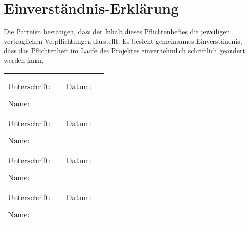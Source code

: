\section{Einverständnis-Erklärung}

Die Parteien bestätigen, dass der Inhalt dieses Pflichtenheftes die jeweiligen vertraglichen Verpflichtungen darstellt. Es besteht gemeinsames Einverständnis, dass das Pflichtenheft im Laufe des Projektes einvernehmlich schriftlich geändert werden kann.

\begin{table}[H]
	\begin{tabularx}{\textwidth}{ |m{2cm}Xm{1.2cm}X| }
		\hline
		\multicolumn{4}{|c|}{} \\
		\multicolumn{4}{|c|}{} \\
		Unterschrift: & \makebox[0.3\columnwidth]{\dotfill} & Datum: & \makebox[0.3\columnwidth]{\dotfill} \\
		\multicolumn{4}{|c|}{} \\
		Name: & \makebox[0.3\columnwidth]{\dotfill} & \multicolumn{2}{c|}{} \\
		\multicolumn{4}{|c|}{} \\
		\multicolumn{4}{|c|}{} \\
		Unterschrift: & \makebox[0.3\columnwidth]{\dotfill} & Datum: & \makebox[0.3\columnwidth]{\dotfill} \\
		\multicolumn{4}{|c|}{} \\
		Name: & \makebox[0.3\columnwidth]{\dotfill} & \multicolumn{2}{c|}{} \\
		\multicolumn{4}{|c|}{} \\
		\multicolumn{4}{|c|}{} \\
		Unterschrift: & \makebox[0.3\columnwidth]{\dotfill} & Datum: & \makebox[0.3\columnwidth]{\dotfill} \\
		\multicolumn{4}{|c|}{} \\
		Name: & \makebox[0.3\columnwidth]{\dotfill} & \multicolumn{2}{c|}{} \\
		\multicolumn{4}{|c|}{} \\
		\multicolumn{4}{|c|}{} \\
		Unterschrift: & \makebox[0.3\columnwidth]{\dotfill} & Datum: & \makebox[0.3\columnwidth]{\dotfill} \\
		\multicolumn{4}{|c|}{} \\
		Name: & \makebox[0.3\columnwidth]{\dotfill} & \multicolumn{2}{c|}{} \\
		\multicolumn{4}{|c|}{} \\
		\multicolumn{4}{|c|}{} \\
		\hline
	\end{tabularx}
\end{table}
